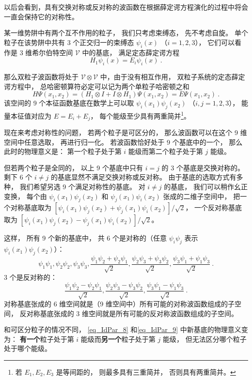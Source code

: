 以后会看到，具有交换对称或反对称的波函数在根据薛定谔方程演化的过程中将会一直会保持它的对称性。

\begin{example}{}
某一维势阱中有两个互不作用的粒子， 我们只考虑束缚态， 先不考虑自旋。 单个粒子在该势阱中共有 3 个正交归一的束缚态 $\psi_i(x)$ （$i=1,2,3$）， 它们可以看作是 3 维希尔伯特空间 $\mathcal V$ 中的基底， 满足定态薛定谔方程
\begin{equation}
H_1 \psi_i(x) = E_i \psi_i(x)~.
\end{equation}

那么双粒子波函数将处于 $\mathcal V\otimes \mathcal V$ 中，由于没有相互作用，  双粒子系统的定态薛定谔方程中， 总哈密顿算符必定可以记为两个单粒子哈密顿之和
\begin{equation}
H\Psi(x_1, x_2) = (H_1\otimes I + I \otimes H_1)\Psi(x_1, x_2) = E \Psi(x_1, x_2)~.
\end{equation}
该空间的 9 个本征函数基底在数学上可以取 $\psi_i(x_1) \psi_j(x_2)$ （$i,j=1,2,3$）， 能量本征值对应为 $E = E_i + E_j$， 每个能级至少具有两重简并\footnote{若 $E_1, E_2, E_3$ 是等间距的， 则最多具有三重简并， 否则具有两重简并。}。

现在来考虑对称性的问题， 若两个粒子是可区分的， 那么波函数可以在这个 9 维空间中任意选取， 再进行归一化。 若波函数恰好处于 9 个基底中的一个， 那么此时的物理意义是： 第一个粒子处于第 $i$ 能级而第二个粒子处于第 $j$ 能级。

但若两个粒子是全同的， 以上 9 个基底中只有 $i = j$ 的 3 个基底是交换对称的。 剩下 6 个 $i\ne j$ 的基底显然不满足交换对称或反对称。 由于基底的选取方式有多种， 我们希望另选 9 个满足对称性的基底。 对 $i\ne j$ 的基底， 我们可以稍作幺正变换， 每个由 $\psi_i(x_1)\psi_j(x_2)$ 和 $\psi_j(x_1)\psi_i(x_2)$ 张成的二维子空间中， 把一个对称基底取为 $[\psi_i(x_1) \psi_j(x_2) + \psi_j(x_1) \psi_i(x_2)]/\sqrt{2}$， 一个反对称基底取为 $[\psi_i(x_1) \psi_j(x_2) - \psi_j(x_1) \psi_i(x_2)]/\sqrt{2}$。

这样， 所有 9 个新的基底中， 共 6 个是对称的（任意 $\psi_i\psi_j$ 表示 $\psi_i(x_1)\psi_j(x_2)$）：
\begin{equation}\label{eq_IdPar_8}
\psi_1\psi_1, \psi_2\psi_2, \psi_3\psi_3,
\frac{\psi_1\psi_2+\psi_2\psi_1}{\sqrt 2},
\frac{\psi_2\psi_3+\psi_3\psi_2}{\sqrt 2},
\frac{\psi_3\psi_1+\psi_1\psi_3}{\sqrt 2}~.
\end{equation}
3 个是反对称的：
\begin{equation}\label{eq_IdPar_9}
\frac{\psi_1\psi_2-\psi_2\psi_1}{\sqrt 2},
\frac{\psi_2\psi_3-\psi_3\psi_2}{\sqrt 2},
\frac{\psi_3\psi_1-\psi_1\psi_3}{\sqrt 2}~.
\end{equation}
对称基底张成的 6 维空间就是（9 维空间中）所有可能的对称波函数组成的子空间， 反对称基底张成的 3 维空间就是所有可能的反对称波函数组成的子空间。

和可区分粒子的情况不同， \autoref{eq_IdPar_8} 和\autoref{eq_IdPar_9} 中新基底的物理意义变为： \textbf{有一个}粒子处于第 $i$ 能级而\textbf{另一个}粒子处于第 $j$ 能级， 但无法区分哪个粒子处于哪个能级。
\end{example}

